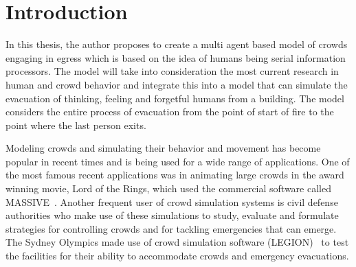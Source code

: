 
\chapter{Introduction}
\label{chapter:Introduction}




In this thesis, the author proposes to create a multi agent based model of crowds engaging in egress which is based on the idea of humans being serial information processors. The model will take into consideration the most current research in human and crowd behavior and integrate this into a model that can simulate the evacuation of thinking, feeling and forgetful humans from a building. The model considers the entire process of evacuation from the point of start of fire to the point where the last person exits.

Modeling crowds and simulating their behavior and movement has become popular in recent times and is being used for a wide range of applications. One of the most famous recent applications was in animating large crowds in the award winning movie, Lord of the Rings, which used the commercial software called MASSIVE~\cite{Regelous:2011vt}. Another frequent user of crowd simulation systems is civil defense authorities who make use of these simulations to study, evaluate and formulate strategies for controlling crowds and for tackling emergencies that can emerge. The Sydney Olympics made use of crowd simulation software (LEGION)~\cite{Still:2000tp} to test the facilities for their ability to accommodate crowds and emergency evacuations.

